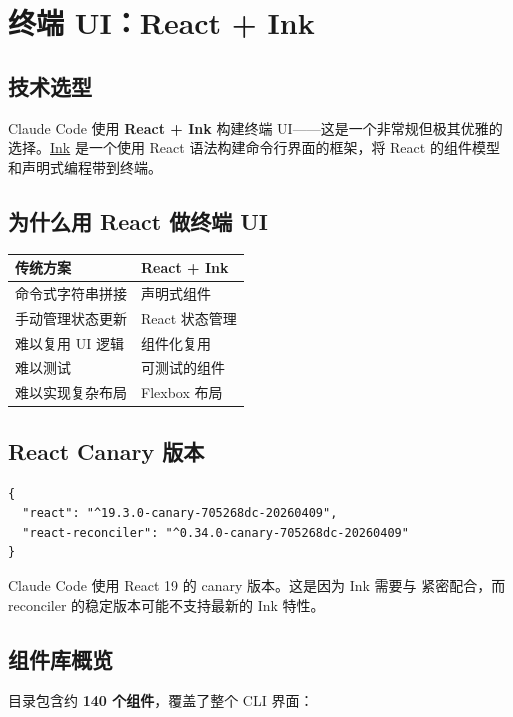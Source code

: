 \chapter{终端 UI：React + Ink}

\section{技术选型}

Claude Code 使用 \textbf{React + Ink} 构建终端 UI——这是一个非常规但极其优雅的选择。\href{https://github.com/vadimdemedes/ink}{Ink} 是一个使用 React 语法构建命令行界面的框架，将 React 的组件模型和声明式编程带到终端。

\section{为什么用 React 做终端 UI}

\begin{longtable}{ll}
\toprule
传统方案 & React + Ink \\
\midrule
命令式字符串拼接 & 声明式组件 \\
手动管理状态更新 & React 状态管理 \\
难以复用 UI 逻辑 & 组件化复用 \\
难以测试 & 可测试的组件 \\
难以实现复杂布局 & Flexbox 布局 \\
\bottomrule
\end{longtable}

\section{React Canary 版本}

\begin{lstlisting}[breaklines=true]
{
  "react": "^19.3.0-canary-705268dc-20260409",
  "react-reconciler": "^0.34.0-canary-705268dc-20260409"
}
\end{lstlisting}

Claude Code 使用 React 19 的 canary 版本。这是因为 Ink 需要与  紧密配合，而 reconciler 的稳定版本可能不支持最新的 Ink 特性。

\section{组件库概览}

 目录包含约 \textbf{140 个组件}，覆盖了整个 CLI 界面：

